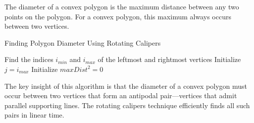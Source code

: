 \begin{definition}
The diameter of a convex polygon is the maximum distance between any two points on the polygon. For a convex polygon, this maximum always occurs between two vertices.
\end{definition}

\begin{algorithm}[H]
\SetAlgoLined
\caption{Finding Polygon Diameter Using Rotating Calipers}

Find the indices $i_{min}$ and $i_{max}$ of the leftmost and rightmost vertices\;
Initialize $j = i_{max}$\;
Initialize $maxDist^2 = 0$\;

\;
\end{algorithm}

\begin{insight}
The key insight of this algorithm is that the diameter of a convex polygon must occur between two vertices that form an antipodal pair—vertices that admit parallel supporting lines. The rotating calipers technique efficiently finds all such pairs in linear time.
\end{insight}